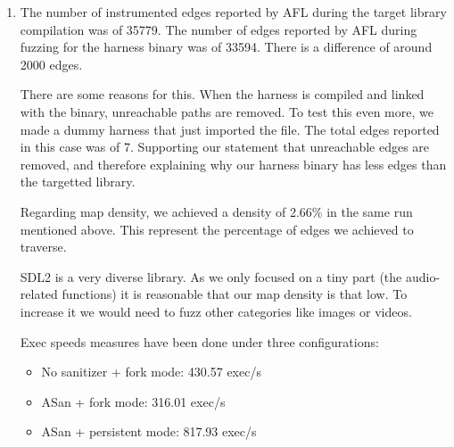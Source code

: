 \documentclass[letterpaper,twocolumn,10pt]{article}
\begin{document}
\begin{enumerate}
    In QEMU mode, the binary is not instrumented. AFL++ runs it through QEMU, which dynamically translates the program while it executes and collects coverage from the translated basic blocks. This adds much more overhead, so the campaign is slower. In our results, QEMU reached only 26.24 exec/s, found 126 edges (Figure 5), and produced a corpus of 15 inputs (Figure 4).

    Because QEMU mode executes fewer test cases in the same wall-clock time, it has fewer chances to discover new paths. This explains why it found fewer edges and added fewer interesting inputs to the corpus. Also, QEMU coverage is recovered dynamically from the binary, so it may not match compile-time edge instrumentation exactly.

    Overall, the instrumented campaign performs better because its coverage collection is faster and more precise, while QEMU mode is slower but useful when the source code or an instrumented binary is not available.

    \item The number of instrumented edges reported by AFL during the target library compilation was of 35779. The number of edges reported by AFL during fuzzing for the harness binary was of 33594. There is a difference of around 2000 edges.

    There are some reasons for this. When the harness is compiled and linked with the binary, unreachable paths are removed. To test this even more, we made a dummy harness that just imported the file. The total edges reported in this case was of 7. Supporting our statement that unreachable edges are removed, and therefore explaining why our harness binary has less edges than the targetted library.

    Regarding map density, we achieved a density of 2.66\% in the same run mentioned above. This represent the percentage of edges we achieved to traverse.

    SDL2 is a very diverse library. As we only focused on a tiny part (the audio-related functions) it is reasonable that our map density is that low. To increase it we would need to fuzz other categories like images or videos.

   Exec speeds measures have been done under three configurations:
   \begin{itemize}
       \item No sanitizer + fork mode: 430.57 exec/s
       \item ASan + fork mode: 316.01 exec/s
       \item ASan + persistent mode: 817.93 exec/s
   \end{itemize}


\end{enumerate}
\end{document}
